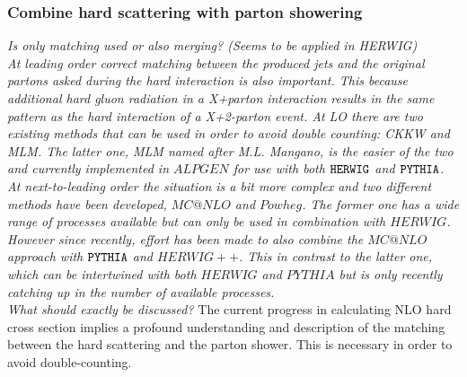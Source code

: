 \subsubsection{Combine hard scattering with parton showering}
\textit{Is only matching used or also merging? (Seems to be applied in HERWIG)}\\

\textit{At leading order correct matching between the produced jets and the original partons asked during the hard interaction is also important. This because additional hard gluon radiation in a X+parton interaction results in the same pattern as the hard interaction of a X+2-parton event. At LO there are two existing methods that can be used in order to avoid double counting: CKKW and MLM. The latter one, MLM named after M.L. Mangano, is the easier of the two and currently implemented in $ALPGEN$ for use with both $\texttt{HERWIG}$ and $\texttt{PYTHIA}$.\\
At next-to-leading order the situation is a bit more complex and two different methods have been developed, $MC@NLO$ and $Powheg$. The former one has a wide range of processes available but can only be used in combination with $HERWIG$. However since recently, effort has been made to also combine the $MC@NLO$ approach with $\texttt{PYTHIA}$ and $HERWIG++$. This in contrast to the latter one, which can be intertwined with both $HERWIG$ and $PYTHIA$ but is only recently catching up in the number of available processes.}\\

\textit{What should exactly be discussed?}
The current progress in calculating NLO hard cross section implies a profound understanding and description of the matching between the hard scattering and the parton shower. This is necessary in order to avoid double-counting.


